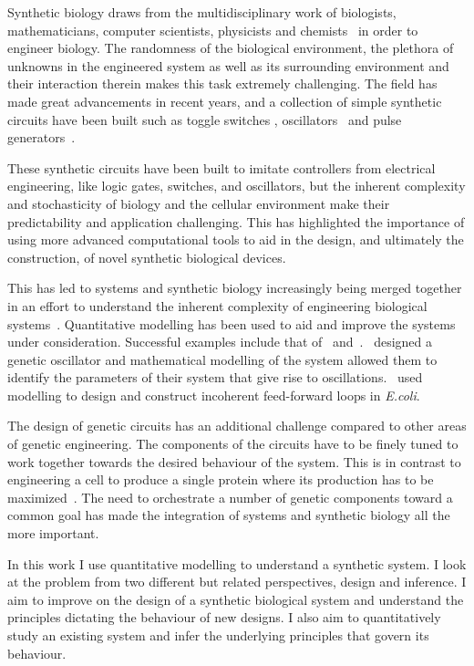 Synthetic biology draws from the multidisciplinary work of biologists, mathematicians, computer scientists, physicists and chemists~\autocite{Vinson:2011hu} in order to engineer biology. The randomness of the biological environment, the plethora of unknowns in the engineered system as well as its surrounding environment and their interaction therein makes this task extremely challenging. The field has made great advancements in recent years, and a collection of simple synthetic circuits have been built such as toggle switches \autocite{Gardner:2000vha, Kramer:2004kq, Isaacs:2003hta, Ham:2008hh, Deans:2007cy, Friedland:2009ce}, oscillators~\autocite{Stricker:2008jqa, Fung:2005jd, Tigges:2009jx} and pulse generators~\autocite{Basu:2004gn}.  

These synthetic circuits have been built to imitate controllers from electrical engineering, like logic gates, switches, and oscillators, but the inherent complexity and stochasticity of biology and the cellular environment make their predictability and application challenging. This has highlighted the importance of using more advanced computational tools to aid in the design, and ultimately the construction, of novel synthetic biological devices. 

This has led to systems and synthetic biology increasingly being merged together in an effort to understand the inherent complexity of engineering biological systems~\autocite{Gramelsberger:2013iu}. Quantitative modelling has been used to aid and improve the systems under consideration. Successful examples include that of~\textcite{Stricker:2008jqa} and~\textcite{Entus:wy}.~\textcite{Stricker:2008jqa}  designed a genetic oscillator and mathematical modelling of the system allowed them to identify the parameters of their system that give rise to oscillations.~\textcite{Entus:wy} used modelling to design and construct incoherent feed-forward loops in \textit{E.coli}.   

The design of genetic circuits has an additional challenge compared to other areas of genetic engineering. The components of the circuits have to be finely tuned to work together towards the desired behaviour of the system. This is in contrast to engineering a cell to produce a single protein where its production has to be maximized~\autocite{Nielsen:2013hs}. The need to orchestrate a number of genetic components toward a common goal has made the integration of systems and synthetic biology all the more important.


In this work I use quantitative modelling to understand a synthetic system. I look at the problem from two different but related perspectives, design and inference. I aim to improve on the design of a synthetic biological system and understand the principles dictating the behaviour of new designs. I also aim to quantitatively study an existing system and infer the underlying principles that govern its behaviour. 



